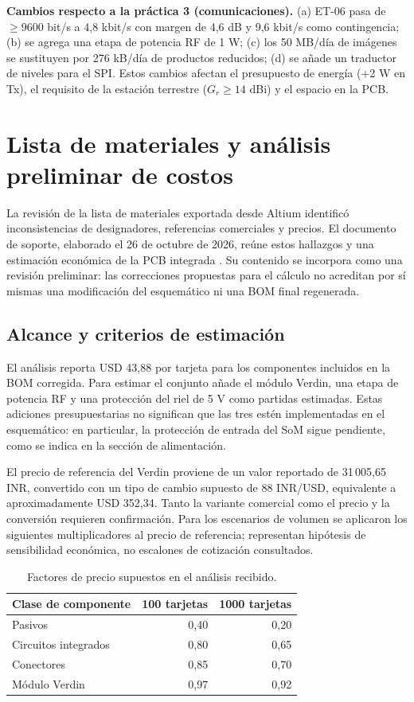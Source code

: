 \documentclass[11pt,letterpaper]{article}
\begin{document}
\textbf{Cambios respecto a la práctica 3 (comunicaciones).} (a) ET-06 pasa de $\geq9600$ bit/s a 4,8 kbit/s con margen de 4,6 dB y 9,6 kbit/s como contingencia; (b) se agrega una etapa de potencia RF de 1 W; (c) los 50 MB/día de imágenes se sustituyen por 276 kB/día de productos reducidos; (d) se añade un traductor de niveles para el SPI. Estos cambios afectan el presupuesto de energía (+2 W en Tx), el requisito de la estación terrestre ($G_r\geq14$ dBi) y el espacio en la PCB.

\section{Lista de materiales y análisis preliminar de costos}
\label{sec:bomcostos}
La revisión de la lista de materiales exportada desde Altium identificó inconsistencias de designadores, referencias comerciales y precios. El documento de soporte, elaborado el 26 de octubre de 2026, reúne estos hallazgos y una estimación económica de la PCB integrada \cite{bomrevision}. Su contenido se incorpora como una revisión preliminar: las correcciones propuestas para el cálculo no acreditan por sí mismas una modificación del esquemático ni una BOM final regenerada.

\subsection{Alcance y criterios de estimación}
El análisis reporta USD 43,88 por tarjeta para los componentes incluidos en la BOM corregida. Para estimar el conjunto añade el módulo Verdin, una etapa de potencia RF y una protección del riel de 5 V como partidas estimadas. Estas adiciones presupuestarias no significan que las tres estén implementadas en el esquemático: en particular, la protección de entrada del SoM sigue pendiente, como se indica en la sección de alimentación.

El precio de referencia del Verdin proviene de un valor reportado de 31\,005,65 INR, convertido con un tipo de cambio supuesto de 88 INR/USD, equivalente a aproximadamente USD 352,34. Tanto la variante comercial como el precio y la conversión requieren confirmación. Para los escenarios de volumen se aplicaron los siguientes multiplicadores al precio de referencia; representan hipótesis de sensibilidad económica, no escalones de cotización consultados.

\begin{table}[htbp]
\centering
\caption{Factores de precio supuestos en el análisis recibido.}
\begin{tabular}{lrr}
\toprule Clase de componente & 100 tarjetas & 1000 tarjetas \\
\midrule
Pasivos & 0,40 & 0,20 \\
Circuitos integrados & 0,80 & 0,65 \\
Conectores & 0,85 & 0,70 \\
Módulo Verdin & 0,97 & 0,92 \\
\bottomrule
\end{tabular}
\end{table}
\end{document}
